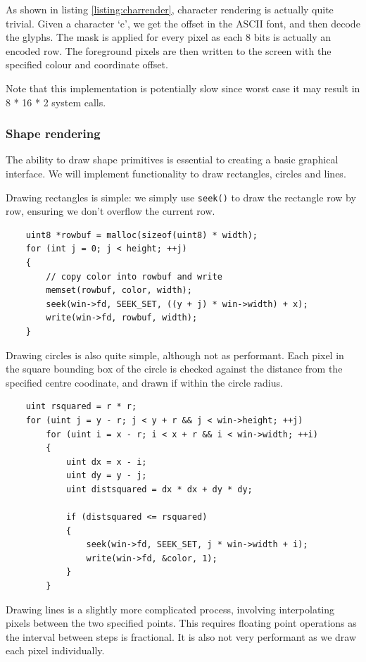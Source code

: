 As shown in listing \ref{listing:charrender}, character rendering is actually 
quite trivial. Given a character `c', we get the offset in the ASCII font, and
then decode the glyphs. The mask is applied for every pixel as each 8 bits
is actually an encoded row. The foreground pixels are then written to the screen
with the specified colour and coordinate offset.

Note that this implementation is potentially slow since worst case it may result in 
8 * 16 * 2 system calls.

\subsubsection{Shape rendering}
The ability to draw shape primitives is essential to creating a basic graphical interface.
We will implement functionality to draw rectangles, circles and lines.

Drawing rectangles is simple: we simply use \texttt{seek()} to draw the rectangle
row by row, ensuring we don't overflow the current row.

\begin{verbatim}
    uint8 *rowbuf = malloc(sizeof(uint8) * width);
    for (int j = 0; j < height; ++j)
    {
        // copy color into rowbuf and write
        memset(rowbuf, color, width);
        seek(win->fd, SEEK_SET, ((y + j) * win->width) + x);
        write(win->fd, rowbuf, width);
    }
\end{verbatim}

Drawing circles is also quite simple, although not as performant. Each pixel
in the square bounding box of the circle is checked against the distance
from the specified centre coodinate, and drawn if within the circle radius. 

\begin{verbatim}
    uint rsquared = r * r;
    for (uint j = y - r; j < y + r && j < win->height; ++j)
        for (uint i = x - r; i < x + r && i < win->width; ++i)
        {
            uint dx = x - i;
            uint dy = y - j;
            uint distsquared = dx * dx + dy * dy;

            if (distsquared <= rsquared)
            {
                seek(win->fd, SEEK_SET, j * win->width + i);
                write(win->fd, &color, 1);
            }
        }
\end{verbatim}

Drawing lines is a slightly more complicated process, involving interpolating
pixels between the two specified points. This requires floating point operations
as the interval between steps is fractional. It is also not very performant as
we draw each pixel individually.

